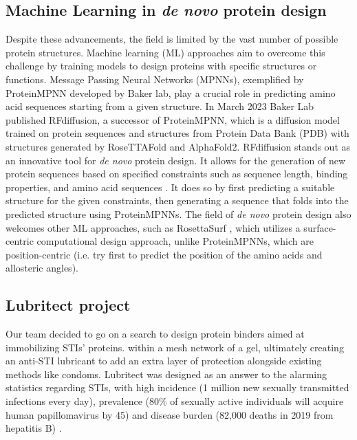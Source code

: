 \documentclass[11pt,a4paper]{article}
\begin{document}
\subsection{Machine Learning in \emph{de novo} protein design}

Despite these advancements, the field is limited by the vast number of 
possible protein structures. Machine learning (ML) approaches 
aim to overcome this challenge by training models to design proteins 
with specific structures or functions. Message Passing Neural Networks 
(MPNNs), exemplified by ProteinMPNN \cite{dauparas2022robust} developed 
by Baker lab, play a  crucial role in predicting amino acid sequences 
starting from a given structure.
In March 2023 Baker Lab published RFdiffusion, a successor of 
ProteinMPNN, which is a diffusion model trained on protein sequences and 
structures from Protein Data Bank (PDB) with structures generated by 
RoseTTAFold and AlphaFold2. RFdiffusion stands out as an innovative 
tool for \emph{de novo} protein design. It allows for the generation of new 
protein sequences based on specified constraints such as sequence 
length, binding properties, and amino acid sequences \cite{
watson2023novo}. It does so by first predicting a suitable structure 
for the given constraints, then generating a sequence that folds into 
the predicted structure using ProteinMPNNs.
The field of \emph{de novo} protein design also welcomes other ML approaches, 
such as RosettaSurf \cite{scheck2022rosettasurf}, which utilizes a surface-centric computational design approach,
unlike ProteinMPNNs, which are position-centric (i.e. try first to predict the position of the amino acids and allosteric angles).

\subsection{Lubritect project}

Our team decided to go on a search to design protein binders aimed at immobilizing STIs' proteins.
within a mesh network of a gel, ultimately creating an anti-STI lubricant to add an extra layer of protection alongside 
existing methods like condoms. 
Lubritect was designed
as an answer to the alarming statistics regarding STIs, with high incidence 
(1 million new sexually transmitted infections every day), 
prevalence (80\% of sexually active individuals will acquire human papillomavirus by 45)
and disease burden (82,000 deaths in 2019 from hepatitis B) \cite{paris_bettencourt_project}.
\end{document}
